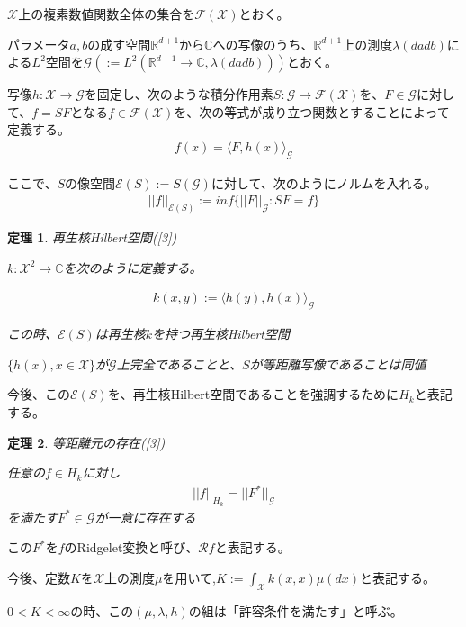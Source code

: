 \documentclass{jsarticle}
\newtheorem{theo}{定理}[section]
\begin{document}
$\mathcal{X}$上の複素数値関数全体の集合を$\mathcal{F}(\mathcal{X})$とおく。

パラメータ$a,b$の成す空間$\mathbb{R}^{d+1}$から$\mathbb{C}$への写像のうち、$\mathbb{R}^{d+1}$上の測度$\lambda(dadb)$による$L^2$空間を$\mathcal{G}(:=L^2(\mathbb{R}^{d+1}\to\mathbb{C},\lambda(dadb)))$とおく。

写像$h:\mathcal{X}\to\mathcal{G}$を固定し、次のような積分作用素$S:\mathcal{G}\to\mathcal{F}(\mathcal{X})$を、$F\in\mathcal{G}$に対して、$f=SF$となる$f\in\mathcal{F}(\mathcal{X})$を、次の等式が成り立つ関数とすることによって定義する。
\begin{align}
f(x)=\langle F,h(x)\rangle_\mathcal{G}
\end{align}

ここで、$S$の像空間$\mathcal{E}(S):=S(\mathcal{G})$に対して、次のようにノルムを入れる。
\begin{align}
||f||_{\mathcal{E}(S)}:=inf\{||F||_\mathcal{G}:SF=f\}
\end{align}


\begin{theo} 再生核Hilbert空間([3])

$k:\mathcal{X}^2\to\mathbb{C}$を次のように定義する。

\begin{align}
k(x,y):=\langle h(y),h(x)\rangle_\mathcal{G}
\end{align}

この時、$\mathcal{E}(S)$は再生核$k$を持つ再生核Hilbert空間

$\{h(x),x\in\mathcal{X}\}$が$\mathcal{G}$上完全であることと、$S$が等距離写像であることは同値

\end{theo}

今後、この$\mathcal{E}(S)$を、再生核Hilbert空間であることを強調するために$H_k$と表記する。

\begin{theo} 等距離元の存在([3])

任意の$f\in H_k$に対し
\begin{align}
||f||_{H_k}=||F^*||_\mathcal{G}
\end{align}
を満たす$F^*\in\mathcal{G}$が一意に存在する
\end{theo}

この$F^*$を$f$のRidgelet変換と呼び、$\mathcal{R}f$と表記する。

今後、定数$K$を$\mathcal{X}$上の測度$\mu$を用いて,$K:=\int_\mathcal{X}k(x,x)\mu(dx)$と表記する。

$0<K<\infty$の時、この$(\mu,\lambda,h)$の組は「許容条件を満たす」と呼ぶ。
\end{document}
